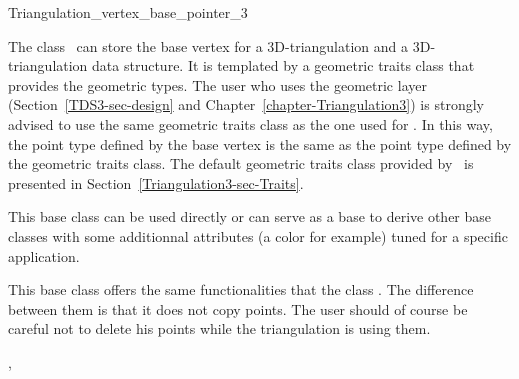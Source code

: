 

\begin{ccRefClass}{Triangulation_vertex_base_pointer_3}  %


\ccDefinition
  
The class \ccRefName\ can store the base vertex for a 3D-triangulation 
and a 3D-triangulation data structure. It is templated by a
geometric traits class  that provides the geometric
types. The user who uses the geometric layer
(Section~\ref{TDS3-sec-design} and
Chapter~\ref{chapter-Triangulation3}) is strongly advised to use the
same geometric traits class  as the one used for
. 
In this way, the point type
defined by the base vertex is the same as the point type defined by
the geometric traits class. The default geometric traits class
provided by \cgal\ is presented in
Section~\ref{Triangulation3-sec-Traits}. 

This base class can be used directly or can serve as a base to derive
other base classes with some additionnal attributes (a color for
example) tuned for a specific application.

This base class offers the same functionalities that the class
. The difference between them is that 
it does not copy points. The user should of course be careful not to
delete his points while the triangulation is using them. 


\ccIsModel


\ccSeeAlso

,



\end{ccRefClass}


